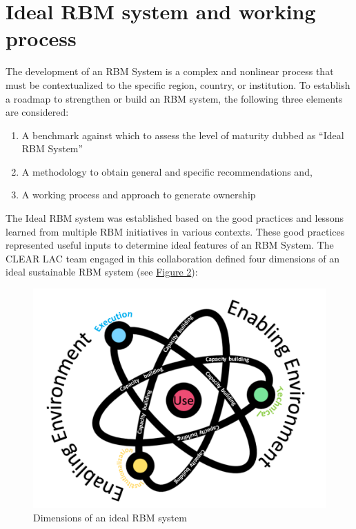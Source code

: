 \documentclass[
  10pt,
]{book}
\providecommand{\tightlist}{%
  \setlength{\itemsep}{0pt}\setlength{\parskip}{0pt}}
\begin{document}
\hypertarget{ideal-rbm-system-and-working-process}{%
\section{Ideal RBM system and working process}\label{ideal-rbm-system-and-working-process}}

The development of an RBM System is a complex and nonlinear process that must be contextualized to the specific region, country, or institution. To establish a roadmap to strengthen or build an RBM system, the following three elements are considered:

\begin{enumerate}
\def\labelenumi{\arabic{enumi}.}
\tightlist
\item
  A benchmark against which to assess the level of maturity dubbed as ``Ideal RBM System''
\item
  A methodology to obtain general and specific recommendations and,
\item
  A working process and approach to generate ownership
\end{enumerate}

The Ideal RBM system was established based on the good practices and lessons learned from multiple RBM initiatives in various contexts. These good practices represented useful inputs to determine ideal features of an RBM System. The CLEAR LAC team engaged in this collaboration defined four dimensions of an ideal sustainable RBM system (see \protect\hyperlink{fig:figure2}{Figure 2}):

\begin{figure}
\includegraphics[width=1\linewidth]{./images/figure_2} \caption{Dimensions of an ideal RBM system}\label{fig:figure2}
\end{figure}
\end{document}
